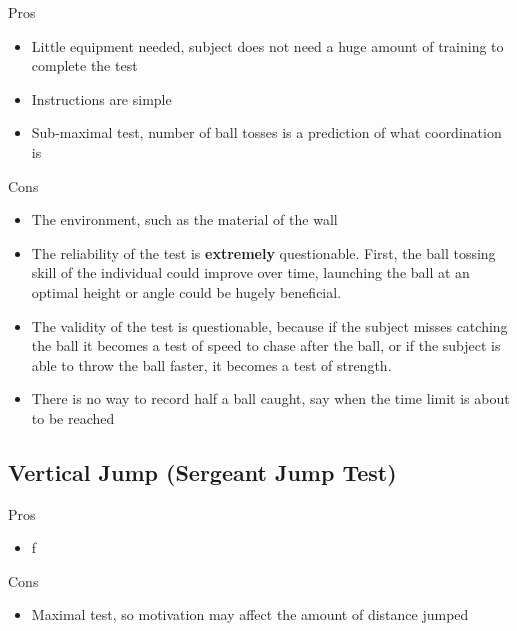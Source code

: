 \documentclass[12pt]{article}
\begin{document}
\begin{minipage}[t]{0.5\textwidth}
    \begin{center}Pros\end{center}
    \begin{itemize}
        \item Little equipment needed, subject does not need a huge amount of training to complete the test
        \item Instructions are simple
        \item Sub-maximal test, number of ball tosses is a prediction of what coordination is
    \end{itemize}
\end{minipage}
\begin{minipage}[t]{0.5\textwidth}
    \begin{center}Cons\end{center}
    \begin{itemize}
        \item The environment, such as the material of the wall
        \item The reliability of the test is \textbf{extremely} questionable. First, the ball tossing skill of the individual could improve over time, launching the ball at an optimal height or angle could be hugely beneficial.
        \item The validity of the test is questionable, because if the subject misses catching the ball it becomes a test of speed to chase after the ball, or if the subject is able to throw the ball faster, it becomes a test of strength.
        \item There is no way to record half a ball caught, say when the time limit is about to be reached
    \end{itemize}
\end{minipage}

\subsection*{Vertical Jump (Sergeant Jump Test)}

\begin{minipage}[t]{0.5\textwidth}
    \begin{center}Pros\end{center}
    \begin{itemize}
        \item f
    \end{itemize}
\end{minipage}
\begin{minipage}[t]{0.5\textwidth}
    \begin{center}Cons\end{center}
    \begin{itemize}
        \item Maximal test, so motivation may affect the amount of distance jumped
    \end{itemize}
\end{minipage}
\end{document}
